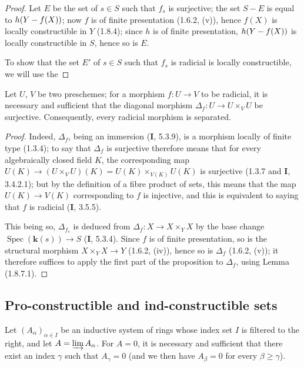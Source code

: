 \begin{proof}
Let $E$ be the set of $s\in S$ such that $f_s$ is surjective; the set
$S-E$ is equal to $h(Y- f(X))$; now $f$ is of finite presentation
(1.6.2, (v)), hence $f(X)$ is locally constructible in $Y$ (1.8.4); since $h$
is of finite presentation, $h(Y- f(X))$ is locally constructible in $S$, hence
so is $E$.

To show that the set $E'$ of $s\in S$ such that $f_s$ is radicial
is locally constructible, we will use the
\end{proof}

\begin{lemma}[1.8.7.1]\label{IV.1.8.7.1}
Let $U$, $V$ be two preschemes; for a morphism $f:U\to V$ to be
radicial, it is necessary and sufficient that the diagonal morphism
$\Delta_f:U\to U\times_VU$ be surjective. Consequently, every radicial
morphism is separated.
\end{lemma}

\begin{proof}
Indeed, $\Delta_f$, being an immersion (\textbf{I}, 5.3.9), is a morphism
locally of finite type (1.3.4); to say that $\Delta_f$ is surjective
therefore means that for every algebraically closed field $K$, the
corresponding map $U(K)\to(U\times_VU)(K)=U(K)\times_{V(K)}U(K)$ is surjective
(1.3.7 and \textbf{I}, 3.4.2.1); but by the definition of a fibre product of sets,
this means that the map $U(K)\to V(K)$ corresponding to $f$ is
injective, and this is equivalent to saying that $f$ is radicial (\textbf{I}, 3.5.5).

This being so, $\Delta_{f_s}$ is deduced from $\Delta_f:X\to X\times_YX$ by
the base change $\operatorname{Spec}(\boldsymbol{k}(s))\to S$ (\textbf{I}, 5.3.4). Since $f$
is of finite presentation, so is the structural morphism
$X\times_YX\to Y$ (1.6.2, (iv)), hence so is $\Delta_f$ (1.6.2, (v)); it
therefore suffices to apply the first part of the proposition to $\Delta_f$,
using Lemma (1.8.7.1).
\end{proof}


\subsection{Pro-constructible and ind-constructible sets}
\label{subsection:IV.1.9}

\begin{lemma}[1.9.1]
\label{IV.1.9.1}
Let $(A_\alpha)_{\alpha\in I}$ be an inductive system of rings whose index
set $I$ is filtered to the right, and let $A=\varinjlim A_\alpha$. For
$A=0$, it is necessary and sufficient that there exist an index $\gamma$ such
that $A_\gamma=0$ (and we then have $A_\beta=0$ for every $\beta\geq\gamma$).
\end{lemma}

